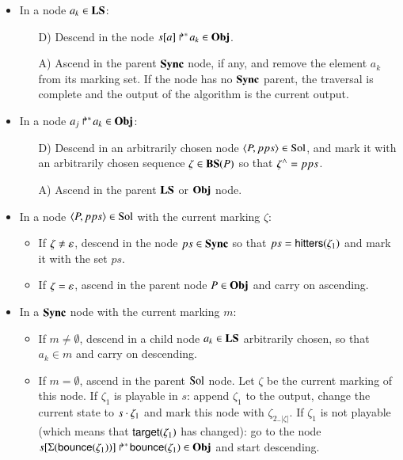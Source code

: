 \begin{itemize}
  \item In a node $a_k \in \mathbf{LS}$:
    \begin{itemize}
      \item[D)] Descend in the node $\mbox{${s[a]}\Rsh^*\!a_k$} \in \mathbf{Obj}$.
      \item[A)] Ascend in the parent $\mathbf{Sync}$ node, if any,
        and remove the element $a_k$ from its marking set.
        If the node has no $\mathbf{Sync}$ parent, the traversal is complete
        and the output of the algorithm is the current output.
    \end{itemize}
  
  \item In a node $\mbox{$a_j\Rsh^*\!a_k$} \in \mathbf{Obj}$:
    \begin{itemize}
      \item[D)] Descend in an arbitrarily chosen node $\langle P, pps \rangle \in \mathrm{Sol}$,
        and mark it with an arbitrarily chosen sequence
        $\zeta \in \mathbf{BS}(P)$ so that $\zeta^\wedge = pps$.
      \item[A)] Ascend in the parent $\mathbf{LS}$ or $\mathbf{Obj}$ node.
    \end{itemize}
  
  \item In a node $\langle P, pps \rangle \in \mathrm{Sol}$ with the current marking $\zeta$:
    \begin{itemize}
      \item If $\zeta \neq \varepsilon$,
        descend in the node $ps \in \mathbf{Sync}$
        so that $ps = \mathsf{hitters}(\zeta_1)$
        and mark it with the set $ps$.
      \item If $\zeta = \varepsilon$,
        ascend in the parent node $P \in \mathbf{Obj}$ and carry on ascending.
    \end{itemize}
  
  \item In a $\mathbf{Sync}$ node with the current marking $m$:
    \begin{itemize}
      \item If $m \neq \emptyset$,
        descend in a child node $a_k \in \mathbf{LS}$ arbitrarily chosen,
        so that $a_k \in m$ and carry on descending.
      \item If $m = \emptyset$,
        ascend in the parent $\mathrm{Sol}$ node.
        Let $\zeta$ be the current marking of this node.
        If $\zeta_1$ is playable in $s$:
          append $\zeta_1$ to the output,
          change the current state to $s \cdot \zeta_1$
          and mark this node with $\zeta_{2..|\zeta|}$.
        If $\zeta_1$ is not playable
        (which means that $\mathsf{target}(\zeta_1)$ has changed):
          go to the node $\mbox{${s[\Sigma(\mathsf{bounce}(\zeta_1))]}\Rsh^*\!\mathsf{bounce}(\zeta_1)$} \in \mathbf{Obj}$
          and start descending.
    \end{itemize}
\end{itemize}

